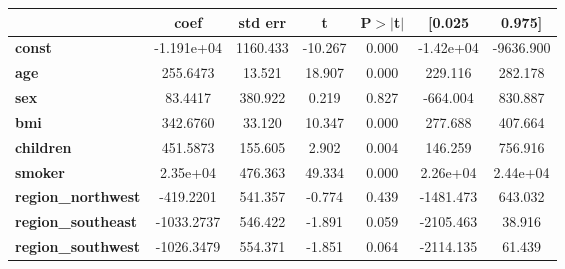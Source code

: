 \begin{center}
\begin{tabular}{lcccccc}
\toprule
                           & \textbf{coef} & \textbf{std err} & \textbf{t} & \textbf{P$> |$t$|$} & \textbf{[0.025} & \textbf{0.975]}  \\
\midrule
\textbf{const}             &   -1.191e+04  &     1160.433     &   -10.267  &         0.000        &    -1.42e+04    &    -9636.900     \\
\textbf{age}               &     255.6473  &       13.521     &    18.907  &         0.000        &      229.116    &      282.178     \\
\textbf{sex}               &      83.4417  &      380.922     &     0.219  &         0.827        &     -664.004    &      830.887     \\
\textbf{bmi}               &     342.6760  &       33.120     &    10.347  &         0.000        &      277.688    &      407.664     \\
\textbf{children}          &     451.5873  &      155.605     &     2.902  &         0.004        &      146.259    &      756.916     \\
\textbf{smoker}            &     2.35e+04  &      476.363     &    49.334  &         0.000        &     2.26e+04    &     2.44e+04     \\
\textbf{region\_northwest} &    -419.2201  &      541.357     &    -0.774  &         0.439        &    -1481.473    &      643.032     \\
\textbf{region\_southeast} &   -1033.2737  &      546.422     &    -1.891  &         0.059        &    -2105.463    &       38.916     \\
\textbf{region\_southwest} &   -1026.3479  &      554.371     &    -1.851  &         0.064        &    -2114.135    &       61.439     \\
\bottomrule
\end{tabular}
\end{center}